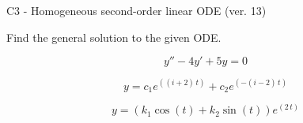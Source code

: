 \begin{exercise}
  \begin{exerciseTitle}C3 - Homogeneous second-order linear ODE (ver. 13)\end{exerciseTitle}
  \begin{exerciseStatement}
    
Find the general solution to the given ODE.

    
\[y''-4y'+5y = 0\]

  \end{exerciseStatement}
  \begin{exerciseAnswer}
    
\[y= c_{1} e^{\left(\left(i + 2\right) \, t\right)} + c_{2} e^{\left(-\left(i - 2\right) \, t\right)}\]

    
\[y= {\left(k_{1} \cos\left(t\right) + k_{2} \sin\left(t\right)\right)} e^{\left(2 \, t\right)}\]

  \end{exerciseAnswer}
\end{exercise}